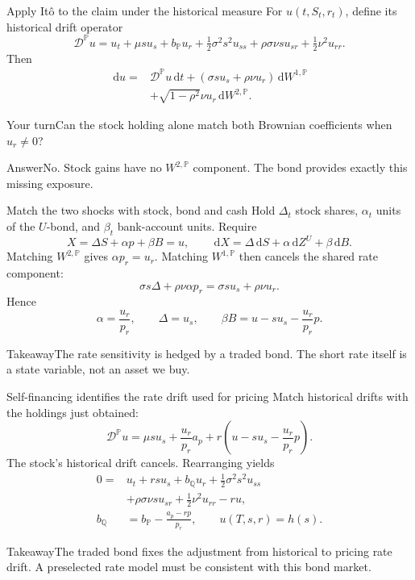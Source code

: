 \documentclass[handout,10pt,t,aspectratio=169]{beamer}
\newenvironment{pausebox}{\begin{block}{Your turn}}{\end{block}}
\newenvironment{answerbox}{\begin{exampleblock}{Answer}}{\end{exampleblock}}
\newenvironment{keybox}{\begin{exampleblock}{Takeaway}}{\end{exampleblock}}
\newcommand{\Q}{\mathbb Q}
\newcommand{\Pp}{\mathbb P}
\newcommand{\dd}{\,\mathrm d}
\begin{document}
\begin{frame}{Apply It\^o to the claim under the historical measure}
\small
For \(u(t,S_t,r_t)\), define its historical drift operator
\[
 \mathcal D^\Pp u=
 u_t+\mu s u_s+b_\Pp u_r+\tfrac12\sigma^2s^2u_{ss}
 +\rho\sigma\nu s u_{sr}+\tfrac12\nu^2u_{rr}.
\]
Then
\[
 \begin{aligned}
 \dd u={}&\mathcal D^\Pp u\dd t
 +(\sigma s u_s+\rho\nu u_r)\dd W^{1,\Pp}\\
 &+\sqrt{1-\rho^2}\nu u_r\dd W^{2,\Pp}.
 \end{aligned}
\]
\begin{pausebox}Can the stock holding alone match both Brownian coefficients
when \(u_r\ne0\)?\end{pausebox}
\begin{answerbox}No. Stock gains have no \(W^{2,\Pp}\) component.
The bond provides exactly this missing exposure.\end{answerbox}
\end{frame}

\begin{frame}{Match the two shocks with stock, bond and cash}
\small
Hold \(\Delta_t\) stock shares, \(\alpha_t\) units of the \(U\)-bond,
and \(\beta_t\) bank-account units. Require
\[
 X=\Delta S+\alpha p+\beta B=u,\qquad
 \dd X=\Delta\dd S+\alpha\dd Z^U+\beta\dd B.
\]
Matching \(W^{2,\Pp}\) gives \(\alpha p_r=u_r\).
Matching \(W^{1,\Pp}\) then cancels the shared rate component:
\[
 \sigma s\Delta+\rho\nu\alpha p_r=\sigma s u_s+\rho\nu u_r.
\]
Hence
\[
 \boxed{\alpha=\frac{u_r}{p_r},\qquad\Delta=u_s,\qquad
 \beta B=u-su_s-\frac{u_r}{p_r}p.}
\]
\begin{keybox}The rate sensitivity is hedged by a traded bond.
The short rate itself is a state variable, not an asset we buy.
\end{keybox}
\end{frame}

\begin{frame}{Self-financing identifies the rate drift used for pricing}
\small
Match historical drifts with the holdings just obtained:
\[
 \mathcal D^\Pp u
 =\mu s u_s+\frac{u_r}{p_r}a_p
   +r\left(u-su_s-\frac{u_r}{p_r}p\right).
\]
The stock's historical drift cancels. Rearranging yields
\[
 \boxed{\begin{aligned}
 0={}&u_t+rsu_s+b_\Q u_r+\tfrac12\sigma^2s^2u_{ss}\\
 &+\rho\sigma\nu s u_{sr}+\tfrac12\nu^2u_{rr}-ru,\\
 b_\Q&=b_\Pp-\frac{a_p-rp}{p_r},\qquad u(T,s,r)=h(s).
 \end{aligned}}
\]
\begin{keybox}The traded bond fixes the adjustment from historical to pricing
rate drift. A preselected rate model must be consistent with this bond market.
\end{keybox}
\end{frame}
\end{document}
